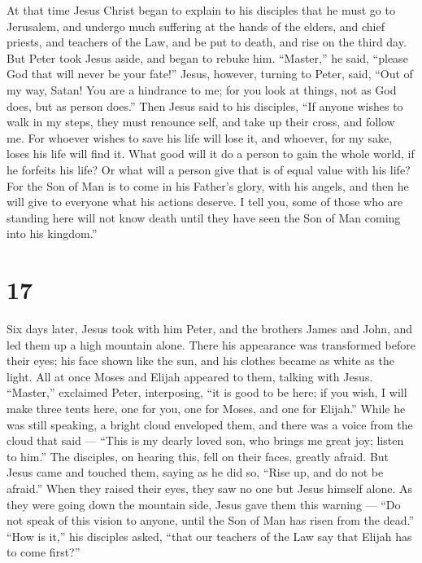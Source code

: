  At that time Jesus Christ began to explain to his
disciples that he must go to Jerusalem, and undergo much suffering at
the hands of the elders, and chief priests, and teachers of the Law, and
be put to death, and rise on the third day.  But Peter took
Jesus aside, and began to rebuke him. ``Master,'' he said, ``please God
that will never be your fate!''  Jesus, however, turning to
Peter, said, ``Out of my way, Satan! You are a hindrance to me; for you
look at things, not as God does, but as person does.'' 
Then Jesus said to his disciples, ``If anyone wishes to walk in my
steps, they must renounce self, and take up their cross, and follow me.
 For whoever wishes to save his life will lose it, and
whoever, for my sake, loses his life will find it.  What
good will it do a person to gain the whole world, if he forfeits his
life? Or what will a person give that is of equal value with his life?
 For the Son of Man is to come in his Father's glory, with
his angels, and then he will give to everyone what his actions deserve.
 I tell you, some of those who are standing here will not
know death until they have seen the Son of Man coming into his
kingdom.''

\hypertarget{section-16}{%
\section{17}\label{section-16}}

 Six days later, Jesus took with him Peter, and the brothers
James and John, and led them up a high mountain alone. 
There his appearance was transformed before their eyes; his face shown
like the sun, and his clothes became as white as the light. 
All at once Moses and Elijah appeared to them, talking with Jesus.
 ``Master,'' exclaimed Peter, interposing, ``it is good to
be here; if you wish, I will make three tents here, one for you, one for
Moses, and one for Elijah.''  While he was still speaking, a
bright cloud enveloped them, and there was a voice from the cloud that
said --- ``This is my dearly loved son, who brings me great joy; listen
to him.''  The disciples, on hearing this, fell on their
faces, greatly afraid.  But Jesus came and touched them,
saying as he did so, ``Rise up, and do not be afraid.'' 
When they raised their eyes, they saw no one but Jesus himself alone.
 As they were going down the mountain side, Jesus gave them
this warning --- ``Do not speak of this vision to anyone, until the Son
of Man has risen from the dead.''  ``How is it,'' his
disciples asked, ``that our teachers of the Law say that Elijah has to
come first?''

